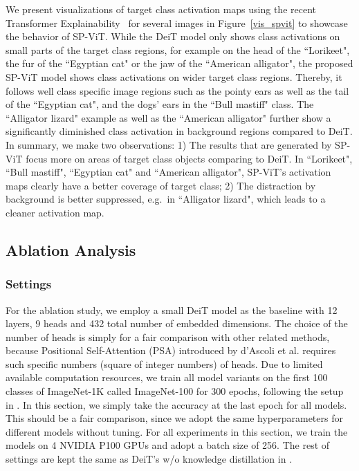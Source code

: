 \documentclass[authorversion, sigconf, acmthm=false, nonacm=true]{acmart}
\begin{document}
We present visualizations of target class activation maps using the recent Transformer Explainability~\cite{Chefer_2021_CVPR} for several images  in Figure~\ref{vis_spvit} to showcase the behavior of SP-ViT. While the DeiT model only shows class activations on small parts of the target class regions, for example on the head of the ``Lorikeet", the fur of the ``Egyptian cat" or the jaw of the ``American alligator", the proposed SP-ViT model shows class activations on wider target class regions. Thereby, it follows well class specific image regions such as the pointy ears as well as the tail of the ``Egyptian cat", and the dogs' ears in the ``Bull mastiff" class. The ``Alligator lizard" example as well as the ``American alligator" further show a significantly diminished class activation in background regions compared to DeiT. In summary, we make two observations: 1) The results that are generated by SP-ViT focus more on areas of target class objects comparing to DeiT. In ``Lorikeet", ``Bull mastiff", ``Egyptian cat" and ``American alligator", SP-ViT's activation maps clearly have a better coverage of target class; 2) The distraction by background is better suppressed, e.g.~in ``Alligator lizard", which leads to a cleaner activation map. 




\subsection{Ablation Analysis}
\label{sec:ablation}
\subsubsection{Settings}
For the ablation study,
we employ a small DeiT model as the  baseline with 12 layers, 9 heads and 432 total number of embedded dimensions.
The choice of the number of heads is simply for a fair comparison with other related methods, because Positional Self-Attention (PSA) introduced by d’Ascoli et al. \cite{d'ascoli2021convit} requires such specific numbers (square of integer numbers) of heads.
Due to limited available computation resources, we 
train all model variants on the first 100 classes of ImageNet-1K called ImageNet-100 for 300 epochs, following the setup in \cite{d'ascoli2021convit}.
In this section, we simply take the accuracy at the last epoch for all models. 
This should be a fair comparison, since we adopt the same hyperparameters for different models without tuning.  
For all experiments in this section, we train the models on 4 NVIDIA P100 GPUs and adopt a batch size of 256. 
The rest of settings are kept the same as DeiT's w/o knowledge distillation in \cite{touvron2021training}.
\end{document}
